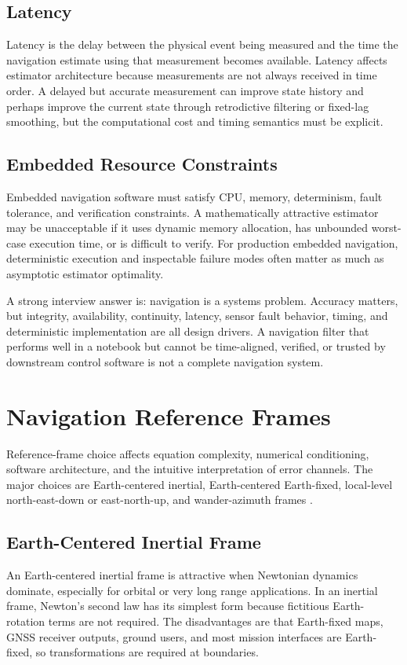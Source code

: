 \documentclass[11pt,oneside]{book}
\begin{document}
\subsection{Latency}
Latency is the delay between the physical event being measured and the time the navigation estimate using that measurement becomes available. Latency affects estimator architecture because measurements are not always received in time order. A delayed but accurate measurement can improve state history and perhaps improve the current state through retrodictive filtering or fixed-lag smoothing, but the computational cost and timing semantics must be explicit.

\subsection{Embedded Resource Constraints}
Embedded navigation software must satisfy CPU, memory, determinism, fault tolerance, and verification constraints. A mathematically attractive estimator may be unacceptable if it uses dynamic memory allocation, has unbounded worst-case execution time, or is difficult to verify. For production embedded navigation, deterministic execution and inspectable failure modes often matter as much as asymptotic estimator optimality.

\begin{interviewbox}
A strong interview answer is: navigation is a systems problem. Accuracy matters, but integrity, availability, continuity, latency, sensor fault behavior, timing, and deterministic implementation are all design drivers. A navigation filter that performs well in a notebook but cannot be time-aligned, verified, or trusted by downstream control software is not a complete navigation system.
\end{interviewbox}

\section{Navigation Reference Frames}
Reference-frame choice affects equation complexity, numerical conditioning, software architecture, and the intuitive interpretation of error channels. The major choices are Earth-centered inertial, Earth-centered Earth-fixed, local-level north-east-down or east-north-up, and wander-azimuth frames \cite{groves2013,titterton2004,farrell2008}.

\subsection{Earth-Centered Inertial Frame}
An Earth-centered inertial frame is attractive when Newtonian dynamics dominate, especially for orbital or very long range applications. In an inertial frame, Newton's second law has its simplest form because fictitious Earth-rotation terms are not required. The disadvantages are that Earth-fixed maps, GNSS receiver outputs, ground users, and most mission interfaces are Earth-fixed, so transformations are required at boundaries.
\end{document}
